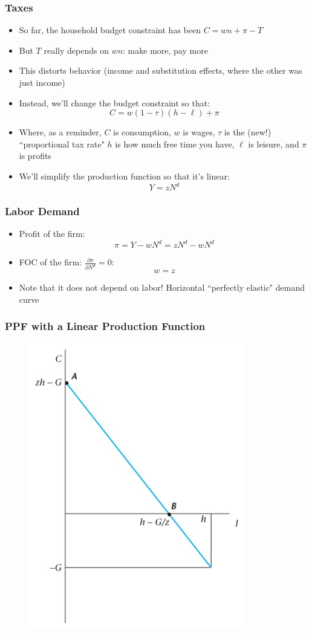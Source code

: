\documentclass{beamer}
\begin{document}
\begin{frame}
\frametitle[alignment=center]{Taxes}
\begin{itemize}
\item So far, the household budget constraint has been $C=wn+\pi-T$
\bigskip
\item But $T$ really depends on $wn$: make more, pay more
\bigskip
\item This distorts behavior (income and substitution effects, where the other was just income)
\bigskip
\item Instead, we'll change the budget constraint so that:
$$C=w(1-\tau)(h-\ell)+\pi$$
\item Where, as a reminder, $C$ is consumption, $w$ is wages, $\tau$ is the (new!) ``proportional tax rate" $h$ is how much free time you have, $\ell$ is leisure, and $\pi$ is profits
\bigskip
\item We'll simplify the production function so that it's linear:
$$Y=zN^d$$
\end{itemize}
\end{frame}

\begin{frame}
\frametitle[alignment=center]{Labor Demand}
\begin{itemize}
\item Profit of the firm:
$$\pi=Y-wN^d=zN^d-wN^d$$
\item FOC of the firm: $\frac{\partial \pi}{\partial N^d}=0$:
$$w=z$$
\item Note that it does not depend on labor!  Horizontal ``perfectly elastic" demand curve
\end{itemize}
\end{frame}

\begin{frame}
\frametitle[alignment=center]{PPF with a Linear Production Function}
\begin{figure}
\centering
\includegraphics[scale=0.5]{Figures/W_Fig_5pt14.png}
\end{figure}
\end{frame}
\end{document}
